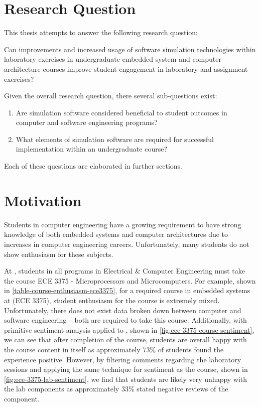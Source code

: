 \section{Research Question}

This thesis attempts to answer the following research question:
\begin{displayquote}
Can improvements and increased usage of software simulation technologies within laboratory exercises in undergraduate embedded system and computer architecture courses improve student engagement in laboratory and assignment exercises?
\end{displayquote}
Given the overall research question, there several sub-questions exist: 
\begin{enumerate}
	\item Are simulation software considered beneficial to student outcomes in computer and software engineering programs?
	\item What elements of simulation software are required for successful implementation within an undergraduate course?
\end{enumerate}
Each of these questions are elaborated in further sections. 

\section{Motivation}

Students in computer engineering have a growing requirement to have strong knowledge of both embedded systems and computer architectures due to increases in computer engineering careers\cite{cec2016, bls2014}. Unfortunately, many students do not show enthusiasm for these subjects. 

At \uwo{}, students in all programs in Electrical \& Computer Engineering must take the course ECE 3375 - Microprocessors and Microcomputers\cite{uwo-we-programprogression, eceoutline-ece3375}. For example, shown in \cref{table-course-enthusiasm-ece3375}, for a required course in embedded systems at \uwo{} (ECE 3375)\cite{eceOutlines}, student enthusiasm for the course is extremely mixed. Unfortunately, there does not exist data broken down between computer and software engineering -- both are required to take this course. Additionally, with primitive sentiment analysis applied to \cite{evals:ece3375-2013, evals:ece3375-2014}, shown in \cref{fig:ece-3375-course-sentiment}, we can see that after completion of the course, students are overall happy with the course content in itself as approximately 73\% of students found the experience positive. However, by filtering comments regarding the laboratory sessions and applying the same technique for sentiment as the course, shown in \cref{fig:ece-3375-lab-sentiment}, we find that students are likely very unhappy with the lab components as approximately 33\% stated negative reviews of the component. 

